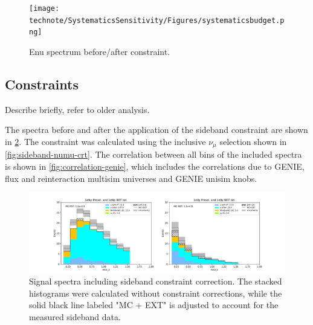 \begin{center}
\begin{figure}[h]
    \texttt{[image: technote/SystematicsSensitivity/Figures/systematicsbudget.png]}
    \caption{Enu spectrum before/after constraint.}
    \label{fig:systematicsbudget}
\end{figure}
\end{center}

\newpage
\subsection{Constraints}


Describe briefly, refer to older analysis.

The spectra before and after the application of the sideband constraint are shown in \cref{fig:constraint}. The constraint was calculated using the inclusive $\nu_\mu$ selection shown in \cref{fig:sideband-numu-crt}. The correlation between all bins of the included spectra is shown in \cref{fig:correlation-genie}, which includes the correlations due to GENIE, flux and reinteraction multisim universes and GENIE unisim knobs.

\begin{center}
\begin{figure}[h]
    \includegraphics[width=1.00\textwidth]{technote/SystematicsSensitivity/Figures/signals_runs_1-5_constrained.pdf}
    \caption{Signal spectra including sideband constraint correction. The stacked histograms were calculated without constraint corrections,  while the solid black line labeled "MC + EXT" is adjusted to account for the measured sideband data.}
    \label{fig:constraint}
\end{figure}
\end{center}

